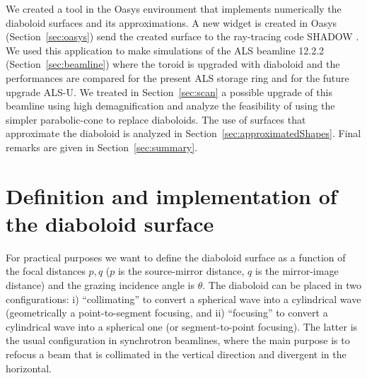 \documentclass{iucr}              %
\newcommand{\inred}[1]{{\color{red}#1}}
\begin{document}
We created a tool in the Oasys environment \cite{codeOASYS} that implements numerically the diaboloid surfaces and its approximations. A new widget is created in Oasys (Section~\ref{sec:oasys}) send the created surface to the ray-tracing code SHADOW \cite{codeSHADOW}. We used this application to make simulations of the ALS beamline 12.2.2 (Section~\ref{sec:beamline}) where the toroid is upgraded with diaboloid and the performances are compared for the present ALS storage ring and for the future upgrade ALS-U. We treated in Section~\ref{sec:scan} a possible upgrade of this beamline using high demagnification and analyze the feasibility of using the simpler parabolic-cone to replace diaboloids. The use of surfaces that approximate the diaboloid is analyzed in Section~\ref{sec:approximatedShapes}. Final remarks are given in Section~\ref{sec:summary}.

\inred{
\section{Definition and implementation of the diaboloid surface}
\label{sec:DiaboloidEqs}
}

For practical purposes we want to define the diaboloid surface as a function of the focal distances $p,q$ ($p$ is the source-mirror distance, $q$ is the mirror-image distance) and the grazing incidence angle is $\theta$. The diaboloid can be placed in two configurations: i) ``collimating'' to convert a spherical wave into a cylindrical wave (geometrically a point-to-segment focusing, and ii) ``focusing'' to convert a cylindrical wave into a spherical one (or segment-to-point focusing). The latter is the usual configuration in synchrotron beamlines, where the main purpose is to refocus a beam that is collimated in the vertical direction and divergent in the horizontal. 


\end{document}
